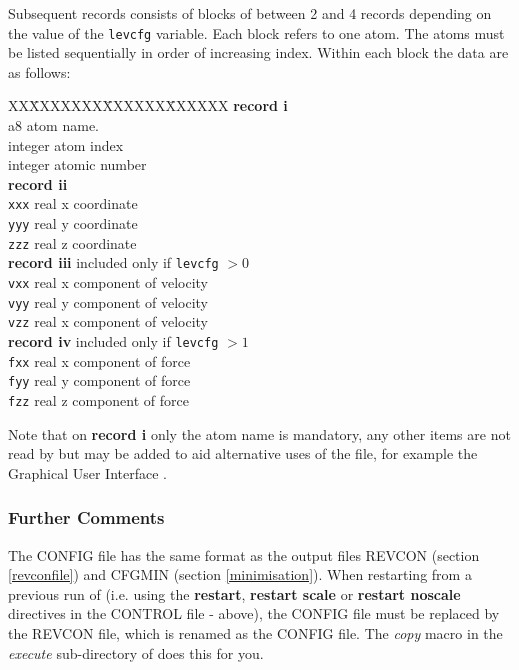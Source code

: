 Subsequent records consists of blocks of between 2 and 4 records
depending on the value of the {\tt levcfg} variable. Each block refers
to one atom. The atoms must be listed sequentially in order of increasing
index. Within each block the data are as follows:
\begin{tabbing}
XX\=XXXXXXX\=XXXXXX\=XXXXXX\kill
{\bf record i}\\
 \>a8 \> atom name.\\
 \> integer \> atom index  \\
 \> integer \> atomic number \\
{\bf record ii}\\ 
\> {\tt xxx} \> real \> x coordinate\\
\> {\tt yyy} \> real \> y coordinate\\
\> {\tt zzz} \> real \> z coordinate\\
{\bf record iii} \> \> included only if {\tt levcfg} $>0$\\
\> {\tt vxx} \> real \> x component of velocity\\
\> {\tt vyy} \> real \> y component of velocity\\
\> {\tt vzz} \> real \> x component of velocity\\
{\bf record iv}\>\> included only if {\tt levcfg} $>1$\\
\> {\tt fxx} \> real \> x component of force\\
\> {\tt fyy} \> real \> y component of force\\
\> {\tt fzz} \> real \> z component of force\\
\end{tabbing}
Note that on {\bf record i} only the atom name is mandatory, any other
items are not read by \D{} but may be added to aid alternative uses of the
file, for example the \D{} Graphical User Interface \cite{smith-gui}.

\subsubsection{Further Comments}

The CONFIG file has the same format as the output files REVCON (section
\ref{revconfile}) and CFGMIN (section \ref{minimisation}). When restarting
from a previous run of \D{} (i.e.  using the {\bf restart}, {\bf restart scale}
or {\bf restart noscale} directives in the CONTROL file - above), the CONFIG
file must be replaced by the REVCON file, which is renamed as the CONFIG file.
The {\sl copy} macro in the {\em execute} sub-directory of \D{} does this for
you.

